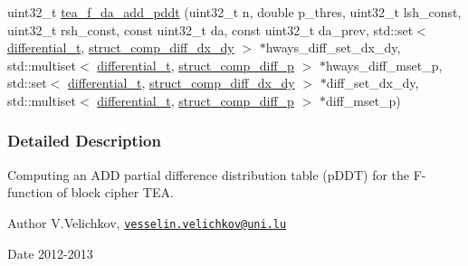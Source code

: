 \begin{DoxyCompactItemize}
\item 
uint32\-\_\-t \hyperlink{tea-f-add-pddt_8cc_a379d6e4054b1bf78e6068f4cbdd06065}{tea\-\_\-f\-\_\-da\-\_\-add\-\_\-pddt} (uint32\-\_\-t n, double p\-\_\-thres, uint32\-\_\-t lsh\-\_\-const, uint32\-\_\-t rsh\-\_\-const, const uint32\-\_\-t da, const uint32\-\_\-t da\-\_\-prev, std\-::set$<$ \hyperlink{structdifferential__t}{differential\-\_\-t}, \hyperlink{structstruct__comp__diff__dx__dy}{struct\-\_\-comp\-\_\-diff\-\_\-dx\-\_\-dy} $>$ $\ast$hways\-\_\-diff\-\_\-set\-\_\-dx\-\_\-dy, std\-::multiset$<$ \hyperlink{structdifferential__t}{differential\-\_\-t}, \hyperlink{structstruct__comp__diff__p}{struct\-\_\-comp\-\_\-diff\-\_\-p} $>$ $\ast$hways\-\_\-diff\-\_\-mset\-\_\-p, std\-::set$<$ \hyperlink{structdifferential__t}{differential\-\_\-t}, \hyperlink{structstruct__comp__diff__dx__dy}{struct\-\_\-comp\-\_\-diff\-\_\-dx\-\_\-dy} $>$ $\ast$diff\-\_\-set\-\_\-dx\-\_\-dy, std\-::multiset$<$ \hyperlink{structdifferential__t}{differential\-\_\-t}, \hyperlink{structstruct__comp__diff__p}{struct\-\_\-comp\-\_\-diff\-\_\-p} $>$ $\ast$diff\-\_\-mset\-\_\-p)
\end{DoxyCompactItemize}


\subsubsection{\-Detailed \-Description}
\-Computing an \-A\-D\-D partial difference distribution table (p\-D\-D\-T) for the \-F-\/function of block cipher \-T\-E\-A. \begin{DoxyAuthor}{\-Author}
\-V.\-Velichkov, \href{mailto:vesselin.velichkov@uni.lu}{\tt vesselin.\-velichkov@uni.\-lu} 
\end{DoxyAuthor}
\begin{DoxyDate}{\-Date}
2012-\/2013 
\end{DoxyDate}


